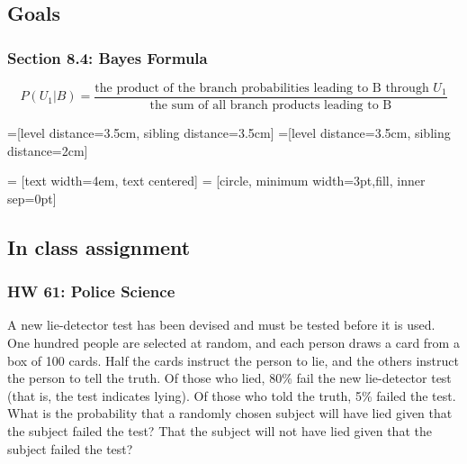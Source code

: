\documentclass[17pt]{extarticle}
\begin{document}
\subsection{Goals}
\subsubsection*{Section 8.4: Bayes Formula}
\[P(U_1|B) =
 \frac{\text{
 the product of the branch probabilities leading to B through $U_1$}}
 {\text{
 the sum of all branch products leading to B}}
\]

=[level distance=3.5cm, sibling distance=3.5cm]
=[level distance=3.5cm, sibling distance=2cm]

 = [text width=4em, text centered]
 = [circle, minimum width=3pt,fill, inner sep=0pt]


\subsection{In class assignment}



\subsubsection*{HW 61: Police Science}
A new lie-detector test has been devised and must be tested before it is used. One hundred people are selected at random, and each person draws a card from a box of 100 cards. Half the cards instruct the person to lie, and the others instruct the person to tell the truth. Of those who lied, 80\% fail the new lie-detector test (that is, the test indicates lying). Of those who told the truth, 5\% failed the test. What is the probability that a randomly chosen subject will have lied given that the subject failed the test? That the subject will not have lied given that the subject failed the test?
\end{document}

